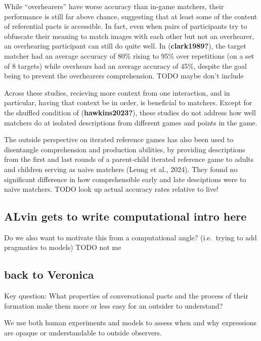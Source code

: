 \documentclass[10pt, letterpaper]{article}
\begin{document}
While ``overhearers'' have worse accuracy than in-game matchers, their
performance is still far above chance, suggesting that at least some of
the content of referential pacts is accessible. In fact, even when pairs
of participants try to obfuscate their meaning to match images with each
other but not an overhearer, an overhearing participant can still do
quite well. In (\textbf{clark1989?}), the target matcher had an average
accuracy of 80\% rising to 95\% over repetitions (on a set of 8 targets)
while overhears had an average accuracy of 45\%, despite the goal being
to prevent the overhearers comprehension. TODO maybe don't include

Across these studies, recieving more context from one interaction, and
in particular, having that context be in order, is beneficial to
matchers. Except for the shuffled condition of (\textbf{hawkins2023?}),
these studies do not address how well matchers do at isolated
descriptions from different games and points in the game.

The outside perspective on iterated reference games has also been used
to disentangle comprehension and production abilities, by providing
descriptions from the first and last rounds of a parent-child iterated
reference game to adults and children serving as naive matchers (Leung
et al., 2024). They found no significant difference in how
comprehensible early and late desciptions were to naive matchers. TODO
look up actual accuracy rates relative to live!

\subsection{ALvin gets to write computational intro
here}\label{alvin-gets-to-write-computational-intro-here}

Do we also want to motivate this from a computational angle?
(i.e.~trying to add pragmatics to models) TODO not me

\subsection{back to Veronica}\label{back-to-veronica}

Key question: What properties of conversational pacts and the process of
their formation make them more or less easy for an outsider to
understand?

We use both human experiments and models to assess when and why
expressions are opaque or understandable to outside observers.
\end{document}
